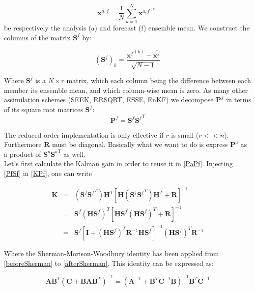 \documentclass[a4paper,12pt]{article}
\begin{document}
\begin{equation}
\overline{\mathbf x^{a,f}}=\frac{1}{N}\sum_{k=1}^N \mathbf x^{a,f^{(k)}} \label{ensmean}
\end{equation}
be respectively the analysis (a) and forecast (f)  ensemble mean.
We construct the columns of the matrix $\mathbf S^f$ by:

\begin{equation}
\left( \mathbf{S}^f \right)_k =\frac{{\mathbf{x}^f}^{(k)}-\overline{\mathbf{x}^f}}{\sqrt{N-1}} \label{Saf}
\end{equation}

Where $\mathbf S^f$ is a $N \times r$ matrix, which each column being the difference between each member its ensemble mean, and which column-wise mean is zero.
As many other assimilation schemes (SEEK, RRSQRT, ESSE, EnKF) we decompose $\mathbf P^f$ in terms of its square root 
matrices $\mathbf S^f$:
\begin{equation}
\mathbf P^f = \mathbf S^f {\mathbf S^f}^T   
\label{PfSf}
\end{equation}

The reduced order
implementation is only effective if $r$ is small ($r << n$). Furthermore
$\mathbf R$ must be diagonal. Basically what we want to do is express $\mathbf{P}^a$ as a product of $\mathbf{S}^a{\mathbf{S}^a}^T$ as well.
\\
Let's  first calculate the Kalman gain in order to reuse it in \eqref{PaPf}. Injecting \eqref{PfSf} in \eqref{KPf}, one can write

\begin{eqnarray}
\mathbf K  
&=& 
(\mathbf S ^f {\mathbf S ^f}^T) \mathbf H ^T \left[\mathbf H (\mathbf S^f  {\mathbf S^f}^T) \mathbf H^T + \mathbf R  \right]^{-1}\label{beforeSherman}\\
&=& 
\mathbf S ^f (\mathbf H \mathbf S ^f)^T  \left[ \mathbf H \mathbf S^f(\mathbf H \mathbf S^f)^T+\mathbf R  \right]^{-1}\label{beforeSherman}\\
&=&
\mathbf S^f\left[\mathbf I + (\mathbf H \mathbf S^f)^T\mathbf R^{-1} \mathbf H \mathbf S^f \right]^{-1}(\mathbf H \mathbf S^f)^T\mathbf R^{-1}\label{afterSherman}
\end{eqnarray}

Where the Sherman-Morison-Woodbury identity has been applied from \eqref{beforeSherman} to \eqref{afterSherman}. This identity can be expressed as:

\begin{equation}
\mathbf{AB}^T{\left(\mathbf{C}+\mathbf{BAB}^T\right)}^{-1} = 
{\left(\mathbf{A}^{-1}+\mathbf{B}^T\mathbf{C}^{-1}\mathbf{B}\right)}^{-1}\mathbf{B}^T\mathbf{C}^{-1}
\end{equation}
\end{document}

